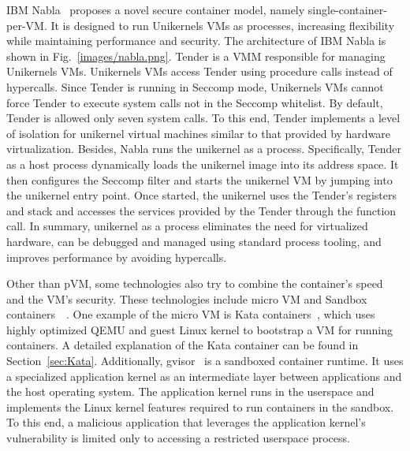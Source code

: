 IBM Nabla~\cite*{10.1145/3267809.3267845} proposes a novel secure container model, namely single-container-per-VM. It is designed to run Unikernels VMs as processes, increasing flexibility while maintaining performance and security. The architecture of IBM Nabla is shown in Fig.~\ref{images/nabla.png}. Tender is a \acrshort{VMM} responsible for managing Unikernels VMs. 
Unikernels VMs access Tender using procedure calls instead of hypercalls. Since Tender is running in Seccomp mode, Unikernels VMs cannot force Tender to execute system calls not in the Seccomp whitelist. By default, Tender is allowed only seven system calls. To this end, Tender implements a level 
of isolation for unikernel virtual machines similar to that provided by hardware virtualization. Besides, Nabla runs the unikernel as a process. Specifically, Tender as a host process dynamically loads the unikernel image into its address space. It then configures the Seccomp filter and starts the 
unikernel VM by jumping into the unikernel entry point. Once started, the unikernel uses the Tender's registers and stack and accesses the services provided by the Tender through the function call. In summary, unikernel as a process eliminates the need for virtualized hardware, can be debugged and 
managed using standard process tooling, and improves performance by avoiding hypercalls.


Other than pVM, some technologies also try to combine the container's speed and the VM's security. These technologies include micro VM and Sandbox containers~~\cite*{future_container}. One example of the micro VM is Kata containers~\cite*{Kata-Containers}, which uses highly optimized QEMU and guest Linux kernel to bootstrap a VM for running containers. 
A detailed explanation of the Kata container can be found in Section~\ref{sec:Kata}. Additionally, gvisor~\cite*{gvisor} is a sandboxed container runtime. It uses a specialized application kernel as an intermediate layer between applications and the host operating system. The application kernel runs in the userspace and 
implements the Linux kernel features required to run containers in the sandbox. To this end, a malicious application that leverages the application kernel's vulnerability is limited only to accessing a restricted userspace process.


